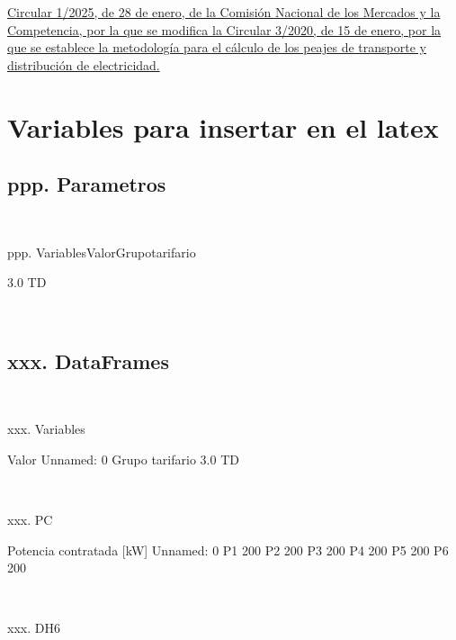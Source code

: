\documentclass[a4paper,10pt]{article}
\begin{document}
\begin{Form}
\begin{thebibliography}{99}
\href{https://www.boe.es/diario_boe/txt.php?id=BOE-A-2025-2044
}
{
Circular 1/2025, de 28 de enero, de la Comisión Nacional de los Mercados y la Competencia, por la que se modifica la Circular 3/2020, de 15 de enero, por la que se establece la metodología para el cálculo de los peajes de transporte y distribución de electricidad.
}



\end{thebibliography}








\ifdefined\MostrarVariablesAlFinal
\newpage
\onecolumn


\newpage 
\section{Variables para insertar en el latex}
\newpage 
\subsection{ppp. Parametros}\

ppp. VariablesValorGrupotarifario

3.0 TD

\
\newpage 
\subsection{xxx. DataFrames}\

xxx. Variables

                  Valor
Unnamed: 0             
Grupo tarifario  3.0 TD

\

xxx. PC

            Potencia contratada [kW]
Unnamed: 0                          
P1                               200
P2                               200
P3                               200
P4                               200
P5                               200
P6                               200

\

xxx. DH6


\end{Form}
\end{document}

